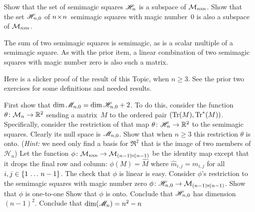 \begin{exercises}
\begin{exparts*}
       \partsitem
         Show that the set of semimagic squares $\mathscr{H}_n$ 
         is a subspace of $\mathcal{M}_{n \! \times \! n}$.
       \partsitem
         Show that 
         the set $\mathscr{H}_{n,0}$  
         of $n \! \times \! n$~semimagic squares with magic number~$0$
         is also a subspace of $\mathcal{M}_{n \! \times \! n}$.
     \end{exparts*}
     \begin{answer}
       \begin{exparts*}
         \partsitem
           The sum of two semimagic squares is semimagic, as is a scalar 
           multiple of a semimagic square.
         \partsitem
           As with the prior item, a linear combination of two semimagic
           squares with magic number zero is also such a matrix.
       \end{exparts*}
     \end{answer}
  \item 
    \cite{Beardon}
    Here is a slicker proof of the result of this Topic, when $n\geq 3$.
    See the prior two exercises for some definitions and needed results.
    \begin{exparts}
      \partsitem
        First show that 
        $\dim\mathscr{M}_{n,0}=\dim\mathscr{H}_{n,0}+2$.
        To do this, consider the function
        $\mbox{$\theta\colon \mathcal{M}_n\to \mathbb{R}^2$}$ sending a 
        matrix~$M$ to
        the ordered pair $(\operatorname{Tr}(M),\operatorname{Tr}^*(M))$.
        Specifically, consider the restriction of that map
        $\mbox{$\theta\colon \mathscr{H}_n\to \mathbb{R}^2$}$ to the semimagic squares.  
        Clearly its null space is $\mathscr{M}_{n,0}$.
        Show that when $n\geq 3$ this restriction $\theta$ is onto.
        (\textit{Hint:} we need only find a basis for 
           $\Re^2$ that is the
           image of two members of $\mathcal{H}_n$)  
      \partsitem
        Let the function $\mbox{$\phi\colon \mathcal{M}_{n \! \times \! n}\to \mathcal{M}_{(n-1) \! \times \! (n-1)}$}$
        be the identity map except that it 
        drops the final row and column: $\phi(M)=\hat{M}$ where 
        $\hat{m}_{i,j}=m_{i,j}$ for all $i,j\in\mbox{$\{1\,\ldots\, n-1\}$}$.
        The check that $\phi$ is linear is easy.
        Consider $\phi$'s restriction to the semimagic squares with 
        magic number zero
       $\mbox{$\phi\colon \mathscr{H}_{n,0}\to \mathcal{M}_{(n-1) \! \times \! (n-1)}$}$.
       Show that $\phi$ is one-to-one
     \partsitem
       Show that $\phi$ is onto.
     \partsitem Conclude that
        $\mathscr{H}_{n,0}$ has dimension~$(n-1)^2$.
     \partsitem 
        Conclude that $\dim(\mathscr{M}_n)=n^2-n$

\end{exparts}
\end{exercises}
